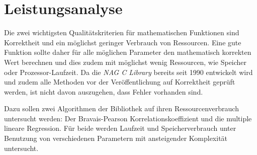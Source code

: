 \section{Leistungsanalyse}

Die zwei wichtigsten Qualitätskriterien für mathematischen Funktionen sind Korrektheit und ein möglichst geringer Verbrauch von Ressourcen.
Eine gute Funktion sollte daher für alle möglichen Parameter den mathematisch korrekten Wert berechnen und dies zudem mit möglichst wenig Ressourcen, wie Speicher oder Prozessor-Laufzeit.
Da die {\it NAG C Library} bereits seit 1990 entwickelt wird\cite{wikipedia:nag} und zudem alle Methoden vor der Veröffentlichung auf Korrektheit geprüft werden\cite{NAG2011}, ist nicht davon auszugehen, dass Fehler vorhanden sind.

Dazu sollen zwei Algorithmen der Bibliothek auf ihren Ressourcenverbrauch untersucht werden: Der Bravais-Pearson Korrelationskoeffizient und die multiple lineare Regression.
Für beide werden Laufzeit und Speicherverbrauch unter Benutzung von verschiedenen Parametern mit ansteigender Komplexität untersucht.
